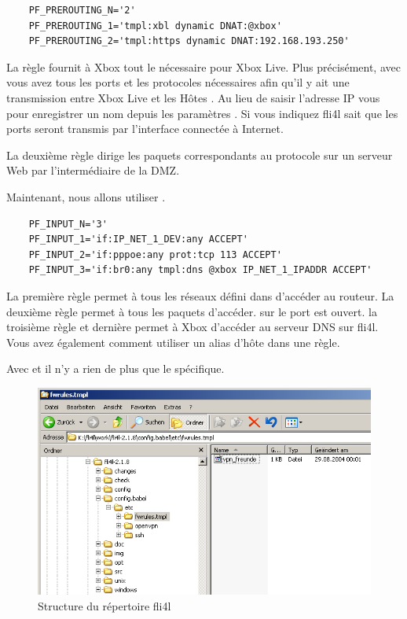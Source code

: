 \begin{example}
\begin{verbatim}
    PF_PREROUTING_N='2'
    PF_PREROUTING_1='tmpl:xbl dynamic DNAT:@xbox'
    PF_PREROUTING_2='tmpl:https dynamic DNAT:192.168.193.250'
\end{verbatim}
\end{example}

La règle  fournit à Xbox tout le nécessaire pour Xbox
Live. Plus précisément, avec  vous avez tous les ports et les
protocoles nécessaires afin qu'il y ait une transmission entre Xbox Live et les
Hôtes . Au lieu de saisir l'adresse IP vous pour enregistrer un
nom depuis les paramètres . Si vous indiquez 
fli4l sait que les ports seront transmis par l'interface connectée à Internet.

La deuxième règle dirige les paquets correspondants au protocole
 sur un serveur Web par l'intermédiaire de la DMZ.

Maintenant, nous allons utiliser .

\begin{example}
\begin{verbatim}
    PF_INPUT_N='3'
    PF_INPUT_1='if:IP_NET_1_DEV:any ACCEPT'
    PF_INPUT_2='if:pppoe:any prot:tcp 113 ACCEPT'
    PF_INPUT_3='if:br0:any tmpl:dns @xbox IP_NET_1_IPADDR ACCEPT'
\end{verbatim}
\end{example}

La première règle permet à tous les réseaux défini dans 
d'accéder au routeur. La deuxième règle permet à tous les paquets
 d'accéder. sur le port  est ouvert. la
troisième règle et dernière permet à Xbox d'accéder au serveur DNS
sur fli4l. Vous avez également comment utiliser un alias d'hôte dans une
règle.

Avec  et  il n'y a rien de plus que le
  spécifique.

\begin{figure}[htbp]
  \centering
  \includegraphics[width=0.9\columnwidth]{etc_fwrules_tmpl_dir}
  \caption{Structure du répertoire fli4l}
  \label{fig:etc_fwrules_tmpl_dir}
\end{figure}

